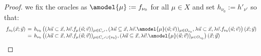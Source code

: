 \documentclass[manuscript,screen]{acmart}
\newcommand{\dfn}{:=}
\theoremstyle{definition}
\theoremstyle{remark}
\newcommand{\model}[1]{\denot{#1}}
\newcommand{\denot}[1]{f_{#1}}
\newcommand{\der}{\mathcal{D}}
\newcommand{\pder}[1]{\der_{#1}}
\newcommand{\close}[1]{{C}_{#1}}
\newcommand{\open}[1]{{O}_{#1}}
\newcommand{\hnu}{\nu_0}
\begin{document}
\begin{proof}
{we fix the oracles as $\amodel{\mu}\dfn \model{\hnu}$ for all $\mu \in X$} and set $h_{\hnu}\dfn h'_{\nu'}$ so that:
\begin{equation}\label{eqn:3}
\arraycolsep=2pt
\begin{array}{rcll}
     \model{{\hnu}}(\vec{x}; \vec{y})
     &=& 
      h_{\hnu}\left(( \lambda \vec{u}\subset \vec{x}, \lambda \vec v. \model{{\mu}}(\vec{u};\vec{v}))_{\mu \in \close{\nu'}},( \lambda \vec{u}\subseteq \vec{x}, \lambda \vec v. \amodel{{\mu}}(\vec{u};\vec{v}))_{\mu \in  \open{\hnu}}, \lambda \vec{u}\subset \vec{x}, \lambda \vec v. \model{{\hnu}}(\vec{u};\vec{v})\right)(\vec{x}; \vec{y})\\
      &=& 
      h_{\hnu}\left(( \lambda \vec{u}\subset \vec{x}, \lambda \vec v. \model{{\mu}}(\vec{u};\vec{v}))_{\mu \in \close{\nu'}\cup \{\hnu\}},( \lambda \vec{u}\subseteq \vec{x}, \lambda \vec v. \amodel{{\mu}}(\vec{u};\vec{v}))_{\mu \in  \open{\hnu}}\right)(\vec{x}; \vec{y})\\

\end{array}
\end{equation}
\end{proof}
\end{document}
